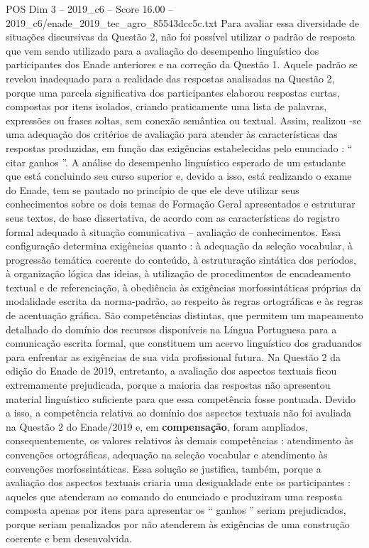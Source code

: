 \begin{textsample}{POS Dim 3 – 2019\_c6 – Score 16.00 – 2019\_c6/enade\_2019\_tec\_agro\_85543dcc5c.txt}
Para avaliar essa diversidade de situações discursivas da Questão 2, não foi possível utilizar o padrão de resposta que vem sendo utilizado para a avaliação do desempenho linguístico dos participantes dos Enade anteriores e na correção da Questão 1.
Aquele padrão se revelou inadequado para a realidade das respostas analisadas na Questão 2, porque uma parcela significativa dos participantes elaborou respostas curtas, compostas por itens isolados, criando praticamente uma lista de palavras, expressões ou frases soltas, sem conexão semântica ou textual.
Assim, realizou -se uma adequação dos critérios de avaliação para atender às características das respostas produzidas, em função das exigências estabelecidas pelo enunciado : “ citar ganhos ”.
A análise do desempenho linguístico esperado de um estudante que está concluindo seu curso superior e, devido a isso, está realizando o exame do Enade, tem se pautado no princípio de que ele deve utilizar seus conhecimentos sobre os dois temas de Formação Geral apresentados e estruturar seus textos, de base dissertativa, de acordo com as características do registro formal adequado à situação comunicativa – avaliação de conhecimentos.
Essa configuração determina exigências quanto : à adequação da seleção vocabular, à progressão temática coerente do conteúdo, à estruturação sintática dos períodos, à organização lógica das ideias, à utilização de procedimentos de encadeamento textual e de referenciação, à obediência às exigências morfossintáticas próprias da modalidade escrita da norma-padrão, ao respeito às regras ortográficas e às regras de acentuação gráfica.
São competências distintas, que permitem um mapeamento detalhado do domínio dos recursos disponíveis na Língua Portuguesa para a comunicação escrita formal, que constituem um acervo linguístico dos graduandos para enfrentar as exigências de sua vida profissional futura.
Na Questão 2 da edição do Enade de 2019, entretanto, a avaliação dos aspectos textuais ficou extremamente prejudicada, porque a maioria das respostas não apresentou material linguístico suficiente para que essa competência fosse pontuada.
Devido a isso, a competência relativa ao domínio dos aspectos textuais não foi avaliada na Questão 2 do Enade/2019 e, em \textbf{compensação}, foram ampliados, consequentemente, os valores relativos às demais competências : atendimento às convenções ortográficas, adequação na seleção vocabular e atendimento às convenções morfossintáticas.
Essa solução se justifica, também, porque a avaliação dos aspectos textuais criaria uma desigualdade ente os participantes : aqueles que atenderam ao comando do enunciado e produziram uma resposta composta apenas por itens para apresentar os “ ganhos ” seriam prejudicados, porque seriam penalizados por não atenderem às exigências de uma construção coerente e bem desenvolvida.

\end{textsample}
